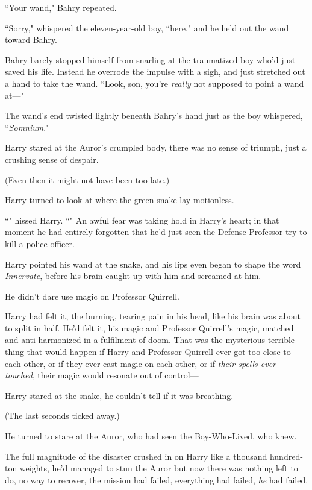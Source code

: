 ``Your wand," Bahry repeated.

``Sorry," whispered the eleven-year-old boy, ``here," and he held out the wand toward Bahry.

Bahry barely stopped himself from snarling at the traumatized boy who'd just saved his life. Instead he overrode the impulse with a sigh, and just stretched out a hand to take the wand. ``Look, son, you're \emph{really} not supposed to point a wand at---"

The wand's end twisted lightly beneath Bahry's hand just as the boy whispered, ``\emph{Somnium}."

\later

Harry stared at the Auror's crumpled body, there was no sense of triumph, just a crushing sense of despair.

(Even then it might not have been too late.)

Harry turned to look at where the green snake lay motionless.

``" hissed Harry. ``" An awful fear was taking hold in Harry's heart; in that moment he had entirely forgotten that he'd just seen the Defense Professor try to kill a police officer.

Harry pointed his wand at the snake, and his lips even began to shape the word \emph{Innervate}, before his brain caught up with him and screamed at him.

He didn't dare use magic on Professor Quirrell.

Harry had felt it, the burning, tearing pain in his head, like his brain was about to split in half. He'd felt it, his magic and Professor Quirrell's magic, matched and anti-harmonized in a fulfilment of doom. That was the mysterious terrible thing that would happen if Harry and Professor Quirrell ever got too close to each other, or if they ever cast magic on each other, or if \emph{their spells ever touched}, their magic would resonate out of control---

Harry stared at the snake, he couldn't tell if it was breathing.

(The last seconds ticked away.)

He turned to stare at the Auror, who had seen the Boy-Who-Lived, who knew.

The full magnitude of the disaster crushed in on Harry like a thousand hundred-ton weights, he'd managed to stun the Auror but now there was nothing left to do, no way to recover, the mission had failed, everything had failed, \emph{he} had failed.

